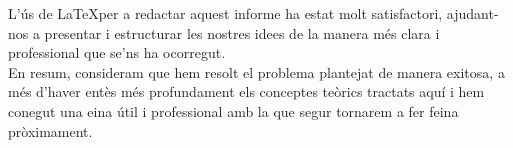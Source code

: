 \documentclass{article}
\begin{document}
L'ús de \LaTeX per a redactar aquest informe ha estat molt satisfactori, ajudant-nos a presentar i estructurar les nostres idees de la manera més clara i professional que se'ns ha ocorregut.\\

En resum, consideram que hem resolt el problema plantejat de manera exitosa, a més d'haver entès més profundament els conceptes teòrics tractats aquí i hem conegut una eina útil i professional amb la que segur tornarem a fer feina pròximament.
\end{document}
